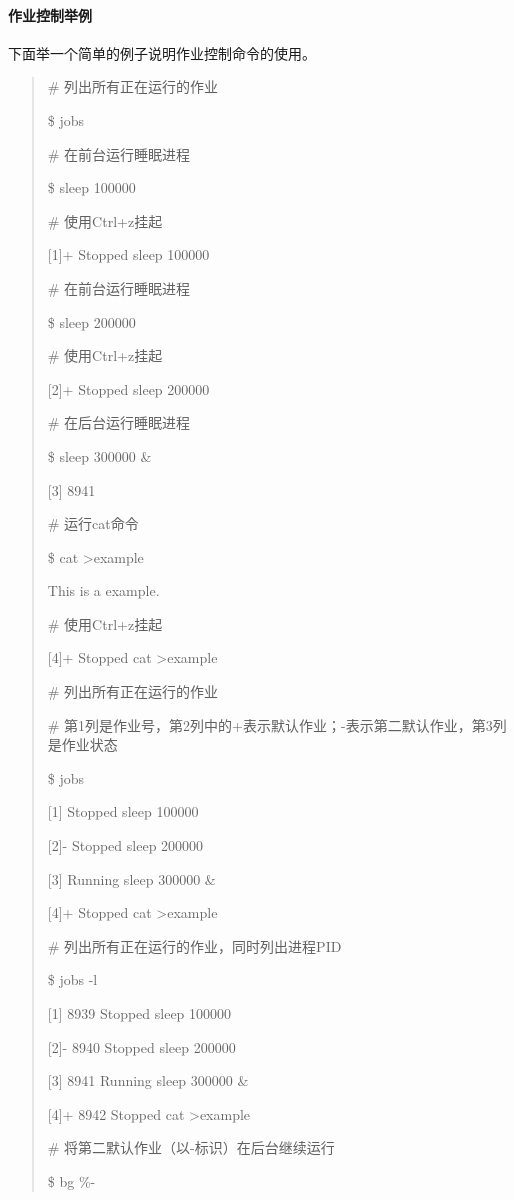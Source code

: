 \documentclass[letterpaper,10pt]{sphinxmanual}
\begin{document}
\paragraph{作业控制举例}
\label{Linux_pro_mana/process:id20}
下面举一个简单的例子说明作业控制命令的使用。
\begin{quote}

\# 列出所有正在运行的作业

\$ jobs

\# 在前台运行睡眠进程

\$ sleep 100000

\# 使用Ctrl+z挂起

{[}1{]}+ Stopped sleep 100000

\# 在前台运行睡眠进程

\$ sleep 200000

\# 使用Ctrl+z挂起

{[}2{]}+ Stopped sleep 200000

\# 在后台运行睡眠进程

\$ sleep 300000 \&

{[}3{]} 8941

\# 运行cat命令

\$ cat \textgreater{}example

This is a example.

\# 使用Ctrl+z挂起

{[}4{]}+ Stopped cat \textgreater{}example

\# 列出所有正在运行的作业

\# 第1列是作业号，第2列中的+表示默认作业；-表示第二默认作业，第3列是作业状态

\$ jobs

{[}1{]} Stopped sleep 100000

{[}2{]}- Stopped sleep 200000

{[}3{]} Running sleep 300000 \&

{[}4{]}+ Stopped cat \textgreater{}example

\# 列出所有正在运行的作业，同时列出进程PID

\$ jobs -l

{[}1{]} 8939 Stopped sleep 100000

{[}2{]}- 8940 Stopped sleep 200000

{[}3{]} 8941 Running sleep 300000 \&

{[}4{]}+ 8942 Stopped cat \textgreater{}example

\# 将第二默认作业（以-标识）在后台继续运行

\$ bg \%-


\end{quote}
\end{document}
